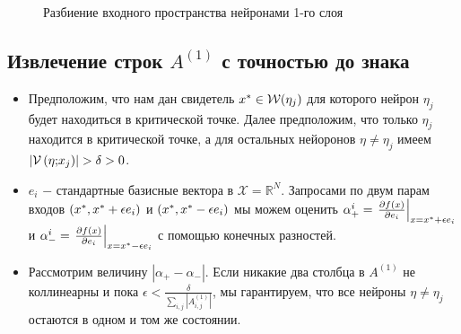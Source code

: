  \begin{figure}[h]
\caption{Разбиение входного пространства нейронами 1-го слоя}
\label{ris:1-deep}
\end{figure}

\subsection {Извлечение строк $A^{\left(1\right)}$ с точностью до знака}
\begin{itemize}
\item
  Предположим, что нам дан свидетель $\mathnormal{x}^{*} \in {\mathcal{W}}(\eta_{j})$ для которого нейрон $\eta_{j}$ будет находиться в критической точке. Далее предположим, что только $\eta_{j}$ находится в критической точке, а для остальных нейоронов $\eta \neq \eta_{j}$ имеем $\left |\mathcal{V} \left ( \eta {;}  \mathnormal{x_{j}} \right ) \right | > \delta > 0$.
\item
  $e_{i}$ $-$ стандартные базисные вектора в ${\mathcal{X}}=\mathbb{R}^{N}$. Запросами по двум парам входов $\left({\mathnormal{x}^{*}}, {\mathnormal{x}^{*}}+\epsilon e_{i}\right)$ и  $\left({\mathnormal{x}^{*}}, {\mathnormal{x}^{*}}-\epsilon e_{i}\right)$ мы можем оценить
$\alpha_{+}^{i}=\left . \frac{\partial \mathnormal{f(x)}}{\partial e_{i}} \right|_{\mathnormal{x}=\mathnormal{x}^{*}+\epsilon e_{i}}$ и $\alpha_{-}^{i}=\left . \frac{\partial \mathnormal{f(x)}}{\partial e_{i}}\right|_{\mathnormal{x}=\mathnormal{x}^{*}-\epsilon e_{i}}$ с помощью конечных разностей.
\item
  Рассмотрим величину $\left | \alpha_+ - \alpha_- \right |$. Если никакие два столбца в $A^{\left(1\right)}$ не коллинеарны и пока $\epsilon < \frac{\delta}{\sum_{i,j}\left|A_{i,j}^{\left(1\right)}\right|}$, мы гарантируем, что все нейроны $\eta \neq \eta_{j}$ остаются в одном и том же состоянии.
  \end{itemize}
